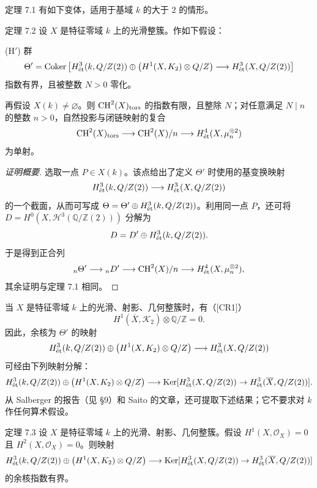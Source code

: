 定理 7.1 有如下变体，适用于基域 $k$ 的大于 $2$ 的情形。
\begin{statement}{定理 7.2}
设 $X$ 是特征零域 $k$ 上的光滑整簇。作如下假设：

\noindent (H$'$) 群
\[
 \Theta'=\operatorname{Coker}\left[
 H^3_{\mathrm{\acute et}}(k,Q/Z(2))\oplus
 \bigl(H^1(X,K_2)\otimes Q/Z\bigr)
 \longrightarrow H^3_{\mathrm{\acute et}}(X,Q/Z(2))\right]
\]
指数有界，且被整数 $N>0$ 零化。

再假设 $X(k)\ne\varnothing$。则 $\operatorname{CH}^2(X)_{\mathrm{tors}}$ 的指数有限，且整除 $N$；对任意满足 $N\mid n$ 的整数 $n>0$，自然投影与闭链映射的复合
\[
 \operatorname{CH}^2(X)_{\mathrm{tors}}\longrightarrow\operatorname{CH}^2(X)/n
 \longrightarrow H^4_{\mathrm{\acute et}}(X,\mu_n^{\otimes2})
\]
为单射。
\end{statement}
\begin{proof}[证明概要]
选取一点 $P\in X(k)$。该点给出了定义 $\Theta'$ 时使用的基变换映射
\[
 H^3_{\mathrm{\acute et}}(k,Q/Z(2))
 \longrightarrow H^3_{\mathrm{\acute et}}(X,Q/Z(2))
\]
的一个截面，从而可写成 $\Theta=\Theta'\oplus H^3_{\mathrm{\acute et}}(k,Q/Z(2))$。利用同一点 $P$，还可将 $D=H^0(X,\mathcal H^3(\mathbb Q/\mathbb Z(2)))$ 分解为
\[
 D=D'\oplus H^3_{\mathrm{\acute et}}(k,Q/Z(2)).
\]
于是得到正合列
\[
 {}_n\Theta'\longrightarrow{}_nD'\longrightarrow\operatorname{CH}^2(X)/n
 \longrightarrow H^4_{\mathrm{\acute et}}(X,\mu_n^{\otimes2}),
\]
其余证明与定理 7.1 相同。
\end{proof}

当 $X$ 是特征零域 $k$ 上的光滑、射影、几何整簇时，有（[CR1]）
\[
 H^1(\overline X,\mathcal K_2)\otimes\mathbb Q/\mathbb Z=0.
\]
因此，余核为 $\Theta'$ 的映射
\[
 H^3_{\mathrm{\acute et}}(k,Q/Z(2))\oplus
 \bigl(H^1(X,K_2)\otimes Q/Z\bigr)
 \longrightarrow H^3_{\mathrm{\acute et}}(X,Q/Z(2))
\]
可经由下列映射分解：
\[
\begin{split}
 H^3_{\mathrm{\acute et}}(k,Q/Z(2))\oplus
 \bigl(H^1(X,K_2)\otimes Q/Z\bigr)
 \longrightarrow\operatorname{Ker}[H^3_{\mathrm{\acute et}}(X,Q/Z(2))
 \to H^3_{\mathrm{\acute et}}(\overline X,Q/Z(2))].
\end{split}
\]
从 Salberger 的报告（见 §9）和 Saito 的文章，还可提取下述结果；它不要求对 $k$ 作任何算术假设。
\begin{statement}{定理 7.3}
设 $X$ 是特征零域 $k$ 上的光滑、射影、几何整簇。假设 $H^1(X,\mathcal O_X)=0$ 且 $H^2(X,\mathcal O_X)=0$。则映射
\[
\begin{split}
 H^3_{\mathrm{\acute et}}(k,Q/Z(2))\oplus
 \bigl(H^1(X,K_2)\otimes Q/Z\bigr)
 \longrightarrow\operatorname{Ker}[H^3_{\mathrm{\acute et}}(X,Q/Z(2))
 \to H^3_{\mathrm{\acute et}}(\overline X,Q/Z(2))]
\end{split}
\]
的余核指数有界。
\end{statement}

